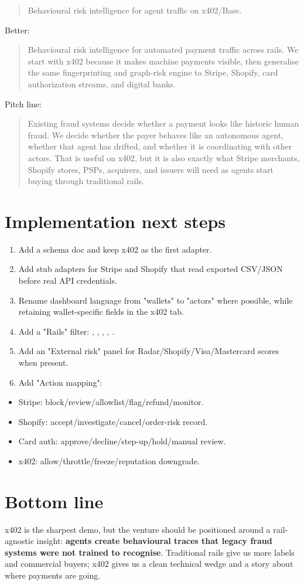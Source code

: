 \documentclass[11pt]{article}
\begin{document}
\begin{quote}
Behavioural risk intelligence for agent traffic on x402/Base.
\end{quote}
Better:

\begin{quote}
Behavioural risk intelligence for automated payment traffic across rails. We start with x402 because it makes machine payments visible, then generalise the same fingerprinting and graph-risk engine to Stripe, Shopify, card authorization streams, and digital banks.
\end{quote}
Pitch line:

\begin{quote}
Existing fraud systems decide whether a payment looks like historic human fraud. We decide whether the payer behaves like an autonomous agent, whether that agent has drifted, and whether it is coordinating with other actors. That is useful on x402, but it is also exactly what Stripe merchants, Shopify stores, PSPs, acquirers, and issuers will need as agents start buying through traditional rails.
\end{quote}
\section{Implementation next steps}
\begin{enumerate}
  \item Add a  schema doc and keep x402 as the first adapter.
  \item Add stub adapters for Stripe and Shopify that read exported CSV/JSON before real API credentials.
  \item Rename dashboard language from "wallets" to "actors" where possible, while retaining wallet-specific fields in the x402 tab.
  \item Add a "Rails" filter: , , , , .
  \item Add an "External risk" panel for Radar/Shopify/Visa/Mastercard scores when present.
  \item Add "Action mapping":
\end{enumerate}
\begin{itemize}
  \item Stripe: block/review/allowlist/flag/refund/monitor.
  \item Shopify: accept/investigate/cancel/order-risk record.
  \item Card auth: approve/decline/step-up/hold/manual review.
  \item x402: allow/throttle/freeze/reputation downgrade.
\end{itemize}
\section{Bottom line}
x402 is the sharpest demo, but the venture should be positioned around a rail-agnostic insight: \textbf{agents create behavioural traces that legacy fraud systems were not trained to recognise}. Traditional rails give us more labels and commercial buyers; x402 gives us a clean technical wedge and a story about where payments are going.
\end{document}
